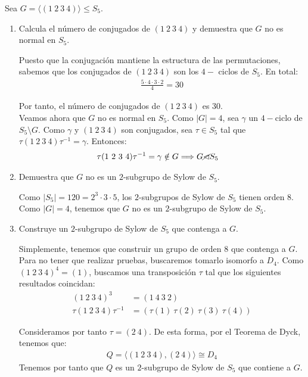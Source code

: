 \documentclass[12pt]{article}
\begin{document}
    \begin{ejercicio}
        Sea $G=\langle (1\ 2\ 3\ 4)\rangle \leq S_5$.
        \begin{enumerate}
            \item Calcula el número de conjugados de $(1\ 2\ 3\ 4)$ y demuestra que $G$ no es normal en $S_5$.
            
            Puesto que la conjugación mantiene la estructura de las permutaciones, sabemos que los conjugados de $(1\ 2\ 3\ 4)$ son los $4-$ ciclos de $S_5$. En total:
            \begin{align*}
                \frac{5\cdot 4\cdot 3\cdot 2}{4} = 30
            \end{align*}

            Por tanto, el número de conjugados de $(1\ 2\ 3\ 4)$ es $30$.\\

            Veamos ahora que $G$ no es normal en $S_5$. Como $|G|=4$, sea $\gamma$ un $4-$ciclo de $S_5\setminus G$. Como $\gamma$ y $(1\ 2\ 3\ 4)$ son conjugados, sea $\tau\in S_5$ tal que $\tau(1\ 2\ 3\ 4)\tau^{-1}=\gamma$. Entonces:
            \begin{align*}
                \tau (1\ 2\ 3\ 4)\tau^{-1} & = \gamma \notin G\Longrightarrow G\cancel{\lhd} S_5
            \end{align*}


            \item Demuestra que $G$ no es un $2$-subgrupo de Sylow de $S_5$.
            
            Como $|S_5|=120=2^3\cdot 3\cdot 5$, los $2$-subgrupos de Sylow de $S_5$ tienen orden $8$. Como $|G|=4$, tenemos que $G$ no es un $2$-subgrupo de Sylow de $S_5$.
            \item Construye un $2$-subgrupo de Sylow de $S_5$ que contenga a $G$.
            
            Simplemente, tenemos que construir un grupo de orden $8$ que contenga a $G$. Para no tener que realizar pruebas, buscaremos tomarlo isomorfo a $D_4$. Como $(1\ 2\ 3\ 4)^4=(1)$, buscamos una transposición $\tau$ tal que los siguientes resultados coincidan:
            \begin{align*}
                (1\ 2\ 3\ 4)^3 &= (1\ 4\ 3\ 2) \\
                \tau(1\ 2\ 3\ 4)\tau^{-1} &= (\tau(1)\ \tau(2)\ \tau(3)\ \tau(4))
            \end{align*}

            Consideramos por tanto $\tau=(2\ 4)$. De esta forma, por el Teorema de Dyck, tenemos que:
            \begin{align*}
                Q=\langle (1\ 2\ 3\ 4), (2\ 4)\rangle \cong D_4
            \end{align*}
            Tenemos por tanto que $Q$ es un $2$-subgrupo de Sylow de $S_5$ que contiene a $G$.
        \end{enumerate}
    \end{ejercicio}
\end{document}
